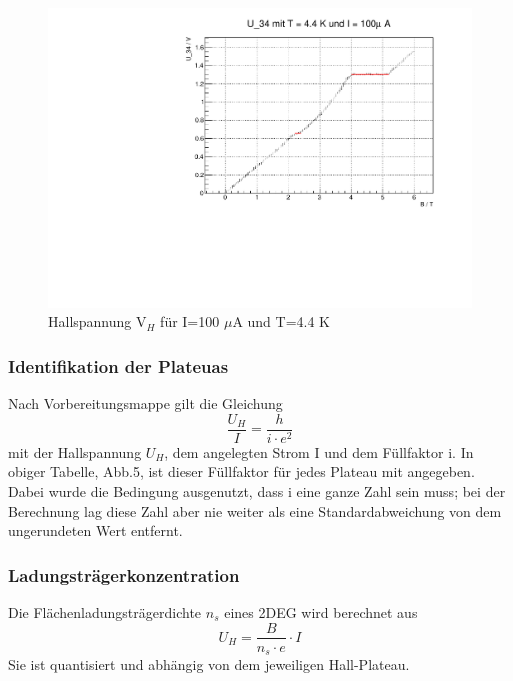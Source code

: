 \begin{figure}
\label{}
\centering
\includegraphics[scale = 0.5]{../plots/U_34_100muA_4400mK.pdf}
\caption{Hallspannung $\text{V}_H$ für I=100 $\mu$A und T=4.4 K}
\end{figure}




\FloatBarrier

\subsubsection{Identifikation der Plateuas}
Nach Vorbereitungsmappe gilt die Gleichung
$$\frac{U_H}{I} = \frac{h}{i \cdot e^{2}} $$
mit der Hallspannung $U_H$, dem angelegten Strom I und dem Füllfaktor i. In obiger Tabelle, Abb.5, ist dieser Füllfaktor für jedes Plateau mit angegeben. Dabei wurde die Bedingung ausgenutzt, dass i eine ganze Zahl sein muss; bei der Berechnung lag diese Zahl aber nie weiter als eine Standardabweichung von dem ungerundeten Wert entfernt.

\subsubsection{Ladungsträgerkonzentration}
Die Flächenladungsträgerdichte $n_s$ eines 2DEG wird berechnet aus
$$U_H = \frac{B}{n_s \cdot e} \cdot I $$
Sie ist quantisiert und abhängig von dem jeweiligen Hall-Plateau.

